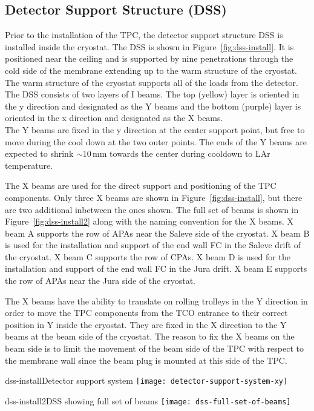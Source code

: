 \subsection{Detector Support Structure (DSS)}


Prior to the installation of the TPC, the detector support structure DSS is installed inside the cryostat.  The DSS is shown in Figure~\ref{fig:dss-install}.  It is positioned near the ceiling and is supported by nine penetrations through the cold side of the membrane extending up to the warm structure of the cryostat.  The warm structure of the cryostat supports all of the loads from the detector.  The DSS consists of two layers of I beams.  The top (yellow) layer is oriented in the y direction and designated as the Y beams and the bottom (purple) layer is oriented in the x direction and designated as the X beams. \\
The Y beams are fixed in the y direction at the center support point, but free to move during the cool down at the two outer points.  The ends of the Y beams are expected to shrink $\sim$10\,mm towards the center during cooldown to LAr temperature.  

The X beams are used for the direct support and positioning of the TPC components.  Only three X beams are shown in Figure~\ref{fig:dss-install}, but there are two additional inbetween the ones shown.  
The full set of beams is shown in Figure~\ref{fig:dss-install2} along with the naming convention for the X beams.
 X beam A supports the row of APAs near the Saleve side of the cryostat.  X beam B is used for the installation and support of the end wall FC in the Saleve drift of the cryostat.  X beam C supports the row of CPAs.  X beam D is used for the installation and support of the end wall FC in the Jura drift.  X beam E supports the row of APAs near the Jura side of the cryostat.  

The X beams have the ability to translate on rolling trolleys in the Y direction in order to move the TPC components from the TCO entrance to their correct position in Y inside the cryostat.  They are fixed in the X direction to the Y beams at the beam side of the cryostat.  The reason 
to fix the X beams on the beam side is to limit the movement of the beam side of the TPC with respect to the membrane wall since
the beam plug is mounted at this side of the TPC.  

\begin{cdrfigure}{dss-install}{Detector support system}
\texttt{[image: detector-support-system-xy]}
\end{cdrfigure}

\begin{cdrfigure}{dss-install2}{DSS showing full set of beams}
 \texttt{[image: dss-full-set-of-beams]}
\end{cdrfigure}